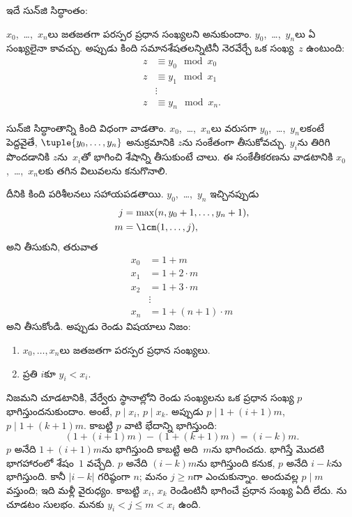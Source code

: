 \documentclass[../../../include/open-logic-section]{subfiles}
\begin{document}
ఇదే సున్‌జి సిద్ధాంతం:
\begin{thm}
$x_0$,~\dots,~$x_n$లు జతజతగా పరస్పర ప్రధాన సంఖ్యలని అనుకుందాం.
$y_0$,~\dots,~$y_n$లు ఏ సంఖ్యలైనా కావచ్చు. అప్పుడు కింది సమానశేషతలన్నిటినీ
నెరవేర్చే ఒక సంఖ్య~$z$ ఉంటుంది:
\begin{align*}
z & \equiv y_0 \mod x_0 \\
z & \equiv y_1 \mod x_1 \\
& \vdots  \\
z & \equiv y_n \mod x_n.
\end{align*}
\end{thm}

సున్‌జి సిద్ధాంతాన్ని కింది విధంగా వాడతాం. $x_0$,~\dots,~$x_n$లు వరుసగా
$y_0$,~\dots,~$y_n$లకంటే పెద్దవైతే, $\tuple{y_0,\dots,y_n}$ అనుక్రమానికి
$z$ను సంకేతంగా తీసుకోవచ్చు. $y_i$ను తిరిగి పొందడానికి $z$ను~$x_i$తో
భాగించి శేషాన్ని తీసుకుంటే చాలు. ఈ సంకేతీకరణను వాడటానికి
$x_0$,~\dots,~$x_n$లకు తగిన విలువలను కనుగొనాలి.

దీనికి కింది పరిశీలనలు సహాయపడతాయి. $y_0$,~\dots,~$y_n$ ఇచ్చినప్పుడు
\begin{align*}
j &= \max(n, y_0 + 1, \dots, y_n + 1), \\
m &= \lcm(1,\dots,j),
\end{align*}
అని తీసుకుని, తరువాత
\begin{align*}
x_0 & = 1 + m \\
x_1 & = 1 + 2 \cdot m \\
x_2 & = 1 + 3 \cdot m \\
& \vdots  \\
x_n & = 1 + (n+1) \cdot m
\end{align*}
అని తీసుకోండి. అప్పుడు రెండు విషయాలు నిజం:
\begin{enumerate}
\item{} $x_0,\dots,x_n$లు జతజతగా పరస్పర ప్రధాన సంఖ్యలు.
\item{} ప్రతి $i$కూ $y_i<x_i$.
\end{enumerate}
 నిజమని చూడటానికి, వేర్వేరు స్థానాల్లోని రెండు సంఖ్యలను ఒక ప్రధాన సంఖ్య $p$ భాగిస్తుందనుకుందాం.
అంటే, $p\mid x_i$, $p\mid x_k$. అప్పుడు
$p\mid1+(i+1)m$, $p\mid1+(k+1)m$. కాబట్టి $p$ వాటి భేదాన్ని భాగిస్తుంది:
\[
(1 + (i+1)m) - (1+ (k+1)m) = (i-k) m.
\]
$p$ అనేది $1+(i+1)m$ను భాగిస్తుంది కాబట్టి అది~$m$ను భాగించదు.
భాగిస్తే మొదటి భాగహారంలో శేషం~$1$ వచ్చేది. $p$ అనేది $(i-k)m$ను
భాగిస్తుంది కనుక, $p$ అనేది $i-k$ను భాగిస్తుంది. కానీ $\left|i-k\right|$ గరిష్ఠంగా
$n$; మనం $j\geq n$గా ఎంచుకున్నాం. అందువల్ల $p\mid m$ వస్తుంది; ఇది మళ్లీ
వైరుధ్యం. కాబట్టి $x_i$, $x_k$ రెండింటినీ భాగించే ప్రధాన సంఖ్య ఏదీ లేదు.
ను చూడటం సులభం. మనకు $y_i<j\leq m<x_i$ ఉంది.
\end{document}
